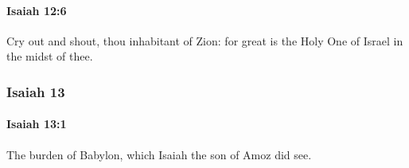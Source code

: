 		\paragraph{Isaiah 12:6} %
			\label{ISAIAH-12-6}

			Cry out and shout, thou inhabitant of Zion: for great is the Holy One of Israel in the midst of thee.

	\subsubsection{Isaiah 13} %
		\label{ISAIAH-13}

		\paragraph{Isaiah 13:1} %
			\label{ISAIAH-13-1}

			The burden of Babylon, which Isaiah the son of Amoz did see.

